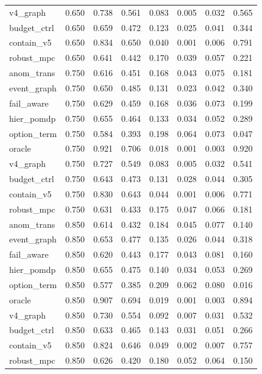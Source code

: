 \documentclass{article}
\begin{document}
\begin{longtable}{@{}lrrrrrrr@{}}
v4\_graph & 0.650 & 0.738 & 0.561 & 0.083 & 0.005 & 0.032 & 0.565 \\
budget\_ctrl & 0.650 & 0.659 & 0.472 & 0.123 & 0.025 & 0.041 & 0.344 \\
contain\_v5 & 0.650 & 0.834 & 0.650 & 0.040 & 0.001 & 0.006 & 0.791 \\
robust\_mpc & 0.650 & 0.641 & 0.442 & 0.170 & 0.039 & 0.057 & 0.221 \\
anom\_trans & 0.750 & 0.616 & 0.451 & 0.168 & 0.043 & 0.075 & 0.181 \\
event\_graph & 0.750 & 0.650 & 0.485 & 0.131 & 0.023 & 0.042 & 0.340 \\
fail\_aware & 0.750 & 0.629 & 0.459 & 0.168 & 0.036 & 0.073 & 0.199 \\
hier\_pomdp & 0.750 & 0.655 & 0.464 & 0.133 & 0.034 & 0.052 & 0.289 \\
option\_term & 0.750 & 0.584 & 0.393 & 0.198 & 0.064 & 0.073 & 0.047 \\
oracle & 0.750 & 0.921 & 0.706 & 0.018 & 0.001 & 0.003 & 0.920 \\
v4\_graph & 0.750 & 0.727 & 0.549 & 0.083 & 0.005 & 0.032 & 0.541 \\
budget\_ctrl & 0.750 & 0.643 & 0.473 & 0.131 & 0.028 & 0.044 & 0.305 \\
contain\_v5 & 0.750 & 0.830 & 0.643 & 0.044 & 0.001 & 0.006 & 0.771 \\
robust\_mpc & 0.750 & 0.631 & 0.433 & 0.175 & 0.047 & 0.066 & 0.181 \\
anom\_trans & 0.850 & 0.614 & 0.432 & 0.184 & 0.045 & 0.077 & 0.140 \\
event\_graph & 0.850 & 0.653 & 0.477 & 0.135 & 0.026 & 0.044 & 0.318 \\
fail\_aware & 0.850 & 0.620 & 0.443 & 0.177 & 0.043 & 0.081 & 0.160 \\
hier\_pomdp & 0.850 & 0.655 & 0.475 & 0.140 & 0.034 & 0.053 & 0.269 \\
option\_term & 0.850 & 0.577 & 0.385 & 0.209 & 0.062 & 0.080 & 0.016 \\
oracle & 0.850 & 0.907 & 0.694 & 0.019 & 0.001 & 0.003 & 0.894 \\
v4\_graph & 0.850 & 0.730 & 0.554 & 0.092 & 0.007 & 0.031 & 0.532 \\
budget\_ctrl & 0.850 & 0.633 & 0.465 & 0.143 & 0.031 & 0.051 & 0.266 \\
contain\_v5 & 0.850 & 0.824 & 0.646 & 0.049 & 0.002 & 0.007 & 0.757 \\
robust\_mpc & 0.850 & 0.626 & 0.420 & 0.180 & 0.052 & 0.064 & 0.150 \\

\end{longtable}
\end{document}
